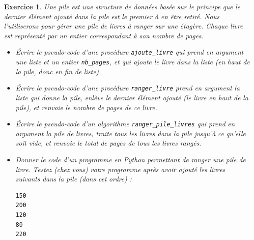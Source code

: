 \documentclass[11pt]{article}
\newtheorem{exercice}{Exercice}[section]
\begin{document}
\begin{exercice}

Une pile est une structure de données basée sur le principe que le dernier élément ajouté dans la pile est le premier à en être retiré.
Nous l'utiliserons pour gérer une pile de livres à ranger sur une étagère. Chaque livre est représenté par un entier correspondant à son nombre de pages.

\vspace{0.3 cm}
\begin{itemize}
\item[1.] \'Ecrire le pseudo-code d'une procédure  \texttt{ajoute\_livre} qui prend en argument une liste et un entier \texttt{nb\_pages}, et qui ajoute le livre dans la liste (en haut de la pile, donc en fin de liste).
\item[2.] \'Ecrire le pseudo-code  d'une procédure \texttt{ranger\_livre} prend en argument la liste qui donne la pile, enlève le dernier élément ajouté (le livre en haut de la pile),
et renvoie le nombre de pages de ce livre.
\item[3.] \'Ecrire le pseudo-code d'un algorithme \texttt{ranger\_pile\_livres} qui prend en argument  la pile de livres, traite tous les livres dans la pile jusqu’à ce qu’elle soit vide,
et renvoie le total de pages de tous les livres rangés. 
\item[4.] Donner le code d'un programme en Python permettant de ranger une pile de livre. 
Testez (chez vous) votre programme après avoir  ajouté les livres suivants dans la pile (dans cet ordre) :


\vspace{0.5 cm}

\begin{verbatim}
150
200
120
80
220
\end{verbatim}


\end{itemize}

\end{exercice}
\end{document}
